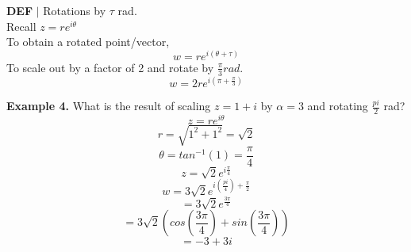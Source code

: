 \documentclass [12pt]{article}
\begin{document}
\begin{framed}
    \noindent\textbf{DEF} $|$ Rotations by $\tau$ rad.\\
    Recall $z=re^{i\theta}$\\
    To obtain a rotated point/vector,
    \[w=re^{i(\theta+\tau)}\]
    To scale out by a factor of 2 and rotate by $\frac{\pi}{3} rad.$
    \[w=2re^{i(\pi+\frac{\pi}{3})}\]
\end{framed}
\noindent\textbf{Example 4.} What is the result of scaling $z=1+i$ by $\alpha=3$ and rotating $\frac{pi}{2}$ rad?\\
\[z=re^{i\theta}\]
\[r=\sqrt{1^2+1^2} = \sqrt{2}\]
\[\theta = tan^{-1}(1) = \frac{\pi}{4}\]
\[z=\sqrt{2}e^{i\frac{\pi}{4}}\]
\[w=3\sqrt{2}e^{i(\frac{pi}{4}) + \frac{\pi}{2}}\]
\[= 3\sqrt{2}e^{\frac{3\pi}{4}}\]
\[=3\sqrt{2}(cos(\frac{3\pi}{4})+sin(\frac{3\pi}{4}))\]
\[=-3+3i\]
\end{document}
